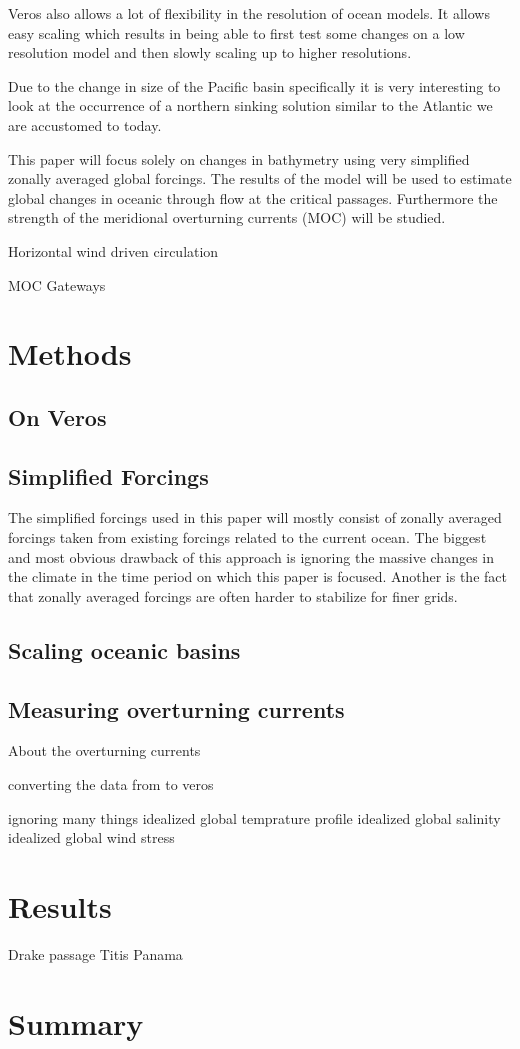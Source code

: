 \documentclass[a4paper]{article}
\begin{document}
\begin{multicols}{2}
Veros also allows a lot of flexibility in the resolution of ocean models. It allows easy scaling which results in being able to first test some changes on a low resolution model and then slowly scaling up to higher resolutions.

Due to the change in size of the Pacific basin specifically it is very interesting to look at the occurrence of a northern sinking solution similar to the Atlantic we are accustomed to today.

This paper will focus solely on changes in bathymetry using very simplified zonally averaged global forcings. The results of the model will be used to estimate global changes in oceanic through flow at the critical passages. Furthermore the strength of the meridional overturning currents (MOC) will be studied.

Horizontal wind driven circulation

MOC
Gateways


\section{Methods}
\subsection{On Veros}
\subsection{Simplified Forcings}
The simplified forcings used in this paper will mostly consist of zonally averaged forcings taken from existing forcings related to the current ocean. The biggest and most obvious drawback of this approach is ignoring the massive changes in the climate in the time period on which this paper is focused. Another is the fact that zonally averaged forcings are often harder to stabilize for finer grids.


\subsection{Scaling oceanic basins}
\subsection{Measuring overturning currents}
About the overturning currents

converting the data from \cite{Muller2008Mar} to veros

ignoring many things
idealized global temprature profile
idealized global salinity
idealized global wind stress


\section{Results}

Drake passage
Titis
Panama

\section{Summary}

\printbibliography

\end{multicols}
\end{document}
